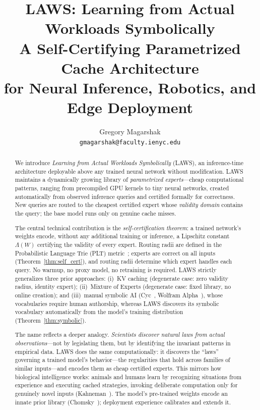 \documentclass[11pt]{article}
\title{LAWS: Learning from Actual Workloads Symbolically\\
\large A Self-Certifying Parametrized Cache Architecture\\
for Neural Inference, Robotics, and Edge Deployment}
\author{Gregory Magarshak\\
\texttt{gmagarshak@faculty.ienyc.edu}}
\date{}
\begin{document}
\maketitle

\begin{abstract}
We introduce \emph{Learning from Actual Workloads Symbolically} (LAWS), an
inference-time architecture deployable above any trained neural network without
modification.  LAWS maintains a dynamically growing library of
\emph{parametrized experts}---cheap computational patterns, ranging from
precompiled GPU kernels to tiny neural networks, created automatically from
observed inference queries and certified formally for correctness.  New queries
are routed to the cheapest certified expert whose \emph{validity domain} contains
the query; the base model runs only on genuine cache misses.

The central technical contribution is the \emph{self-certification theorem}: a
trained network's weights encode, without any additional training or inference, a
Lipschitz constant $\Lambda(W)$ certifying the validity of every expert.
Routing radii are defined in the Probabilistic Language Trie (PLT)
metric~\cite{plt2026}; experts are correct on all inputs
(Theorem~\ref{thm:self_cert}), and routing radii determine which expert
handles each query.  No warmup, no proxy model, no retraining is required.
LAWS strictly generalizes three prior approaches: (i)~KV caching (degenerate
case: zero validity radius, identity expert); (ii)~Mixture of Experts (degenerate
case: fixed library, no online creation); and (iii)~manual symbolic AI
(Cyc~\cite{lenat1995}, Wolfram Alpha~\cite{wolfram2002}), whose vocabularies
require human authorship, whereas LAWS discovers its symbolic vocabulary
automatically from the model's training distribution (Theorem~\ref{thm:symbolic}).

The name reflects a deeper analogy.  \emph{Scientists discover natural laws from
actual observations}---not by legislating them, but by identifying the invariant
patterns in empirical data.  LAWS does the same computationally: it discovers the
``laws'' governing a trained model's behavior---the regularities that hold across
families of similar inputs---and encodes them as cheap certified experts.  This
mirrors how biological intelligence works: animals and humans learn by
recognizing situations from experience and executing cached strategies, invoking
deliberate computation only for genuinely novel inputs
(Kahneman~\cite{kahneman2011}).  The model's pre-trained weights encode an
innate prior library (Chomsky~\cite{chomsky1965}); deployment experience
calibrates and extends it.


\end{abstract}
\end{document}
